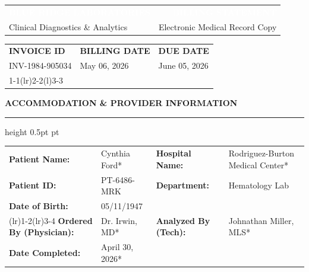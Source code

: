 \documentclass[10pt,letterpaper]{article}
\begin{document}
\begin{tcolorbox}[headerbox]
    \begin{tabularx}{\textwidth}{X r}
        \textcolor{white}{\fontsize{20pt}{24pt}\selectfont\bfseries BLUE RIDGE LABORATORIES} & 
        \textcolor{white}{\fontsize{14pt}{18pt}\selectfont\bfseries BILLING STATEMENT} \\
        \textcolor{white!80!branddark}{\small Clinical Diagnostics \& Analytics} & 
        \textcolor{white!80!branddark}{\small Electronic Medical Record Copy}
    \end{tabularx}
\end{tcolorbox}

\vspace{1em}

\begin{tabularx}{\textwidth}{@{}X X X@{}}
    {\bfseries\color{brandsecondary} INVOICE ID} & {\bfseries\color{brandsecondary} BILLING DATE} & {\bfseries\color{brandsecondary} DUE DATE} \\
    INV-1984-905034 & May 06, 2026 & June 05, 2026 \\
    \cmidrule(r){1-1}\cmidrule(lr){2-2}\cmidrule(l){3-3}
\end{tabularx}

\vspace{1.5em}

\begin{tcolorbox}[invoicebox]
    {\fontsize{12pt}{14pt}\selectfont\bfseries\color{branddark} ACCOMMODATION \& PROVIDER INFORMATION}
    \vspace{0.8em}
    \hrule height 0.5pt pt\color{borderlight}
    \vspace{0.8em}
    
    \begin{tabularx}{\textwidth}{@{}l X l X@{}}
        {\bfseries Patient Name:} & Cynthia Ford* & {\bfseries Hospital Name:} & Rodriguez-Burton Medical Center* \\
        {\bfseries Patient ID:} & PT-6486-MRK & {\bfseries Department:} & Hematology Lab \\
        {\bfseries Date of Birth:} & 05/11/1947 & & \\
        \addlinespace
        \cmidrule(lr){1-2}\cmidrule(lr){3-4}
        \addlinespace
        {\bfseries Ordered By (Physician):} & Dr. Irwin, MD* & {\bfseries Analyzed By (Tech):} & Johnathan Miller, MLS* \\
        {\bfseries Date Completed:} & April 30, 2026* & & \\
    \end{tabularx}
\end{tcolorbox}
\end{document}
